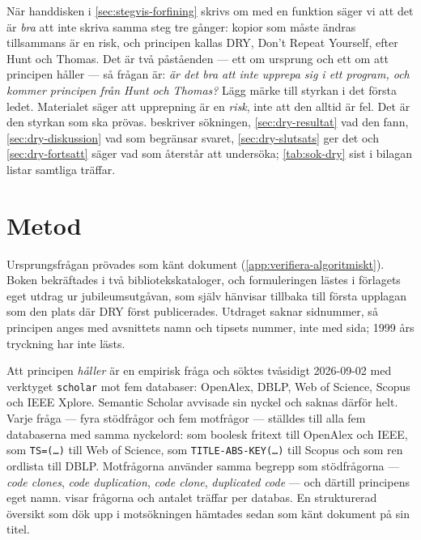 När handdisken i \cref{sec:stegvis-forfining} skrivs om med en funktion
säger vi att det är \emph{bra} att inte skriva samma steg tre gånger:
kopior som måste ändras tillsammans är en risk, och principen kallas DRY,
\foreignlanguage{english}{Don't Repeat Yourself}, efter Hunt och
Thomas\autocite{HuntThomas1999}.  Det är två påståenden --- ett om
ursprung och ett om att principen håller --- så frågan är: \emph{är det
bra att inte upprepa sig i ett program, och kommer principen från Hunt
och Thomas?}  Lägg märke till styrkan i det första ledet.  Materialet
säger att upprepning är en \emph{risk}, inte att den alltid är fel.  Det
är den styrkan som ska prövas.   beskriver
sökningen, \cref{sec:dry-resultat} vad den fann,
\cref{sec:dry-diskussion} vad som begränsar svaret,
\cref{sec:dry-slutsats} ger det och \cref{sec:dry-fortsatt} säger vad
som återstår att undersöka; \cref{tab:sok-dry} sist i bilagan
listar samtliga träffar.

\section{Metod}
\label{sec:dry-metod}

Ursprungsfrågan prövades som känt dokument
(\cref{app:verifiera-algoritmiskt}).  Boken
bekräftades i två bibliotekskataloger, och formuleringen lästes i
förlagets eget utdrag ur jubileumsutgåvan\autocite{ThomasHunt2019}, som
själv hänvisar tillbaka till första upplagan som den plats där DRY först
publicerades.  Utdraget saknar sidnummer, så principen anges med
avsnittets namn och tipsets nummer, inte med sida; 1999 års tryckning har
inte lästs.

Att principen \emph{håller} är en empirisk fråga och söktes tvåsidigt
2026-09-02 med verktyget \texttt{scholar} mot fem databaser: OpenAlex,
DBLP, Web of Science, Scopus och IEEE Xplore.  Semantic Scholar avvisade
sin nyckel och saknas därför helt.  Varje fråga --- fyra stödfrågor och fem motfrågor --- ställdes
till alla fem databaserna med samma nyckelord: som boolesk fritext till
OpenAlex och IEEE, som \texttt{TS=(\dots)} till Web of Science, som
\texttt{TITLE-ABS-KEY(\dots)} till Scopus och som ren ordlista till DBLP.
Motfrågorna använder samma begrepp som stödfrågorna --- \emph{code
clones}, \emph{code duplication}, \emph{code clone}, \emph{duplicated
code} --- och därtill principens eget namn.   visar
frågorna och antalet träffar per databas.  En strukturerad översikt som
dök upp i motsökningen hämtades sedan som känt dokument på sin titel.

